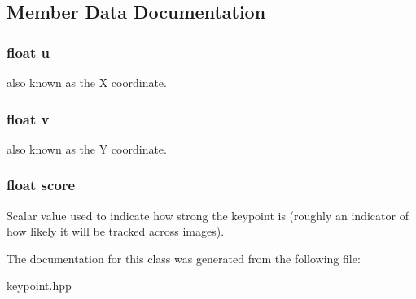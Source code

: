 \subsection{Member Data Documentation}
\hypertarget{classfovis_1_1KeyPoint_a55831f7eab5ed2917a0191e858852f42}{
\subsubsection[{u}]{\setlength{\rightskip}{0pt plus 5cm}float {\bf u}}}
\label{classfovis_1_1KeyPoint_a55831f7eab5ed2917a0191e858852f42}
also known as the X coordinate. \hypertarget{classfovis_1_1KeyPoint_a48d9522e58fa05906c6dba23e5745a72}{
\subsubsection[{v}]{\setlength{\rightskip}{0pt plus 5cm}float {\bf v}}}
\label{classfovis_1_1KeyPoint_a48d9522e58fa05906c6dba23e5745a72}
also known as the Y coordinate. \hypertarget{classfovis_1_1KeyPoint_a8c5cd9b525ee73a24b1d9d8e34982d1c}{
\subsubsection[{score}]{\setlength{\rightskip}{0pt plus 5cm}float {\bf score}}}
\label{classfovis_1_1KeyPoint_a8c5cd9b525ee73a24b1d9d8e34982d1c}
Scalar value used to indicate how strong the keypoint is (roughly an indicator of how likely it will be tracked across images). 

The documentation for this class was generated from the following file:\begin{DoxyCompactItemize}
\item 
keypoint.hpp\end{DoxyCompactItemize}
